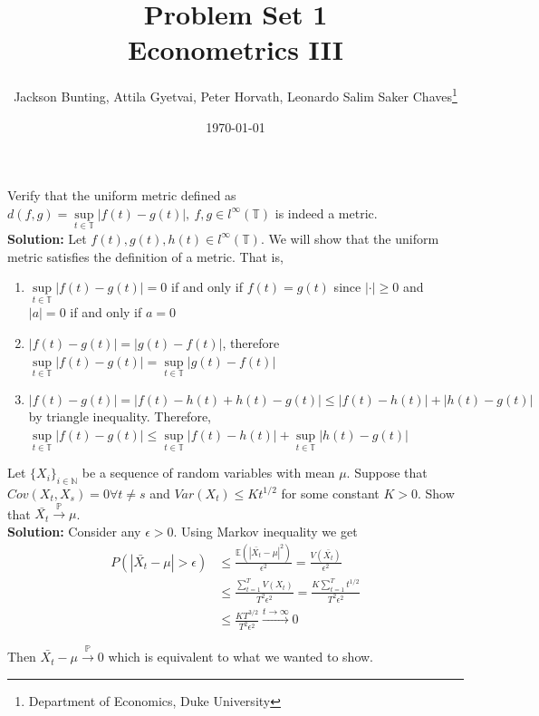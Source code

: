 \documentclass[11pt,letterpaper]{article}                  %
\title{Problem Set 1 \\ \medskip \Large{Econometrics III}}
\author{\Large Jackson Bunting, Attila Gyetvai, Peter Horvath, Leonardo Salim Saker Chaves\footnote{Department of Economics, Duke University}}
\date{\today}
\begin{document}
\maketitle
\begin{problem}
Verify that the uniform metric defined as $d (f, g) = \sup\limits_{t \in \mathbb{T}} |f(t) - g(t)|, \:  f, g \in l^{\infty}(\mathbb{T})$ is indeed a metric. \\

\textbf{Solution:} Let $f(t), g(t), h(t) \in l^{\infty}(\mathbb{T})$. We will show that the uniform metric satisfies the definition of a metric. That is, 
\begin{enumerate}
	\item  $\sup\limits_{t \in \mathbb{T}} |f(t) - g(t)| = 0$ if and only if $f(t) = g(t)$ since $|\cdot| \geq 0$ and $|a| = 0$ if and only if $a = 0$
	\item  $|f(t) - g(t)| = |g(t) - f(t)|$, therefore $\sup\limits_{t \in \mathbb{T}} |f(t) - g(t)| = \sup\limits_{t \in \mathbb{T}} |g(t) - f(t)|$
	\item $|f(t) - g(t)| = |f(t) - h(t) + h(t) - g(t)| \leq |f(t) - h(t)| +  |h(t) - g(t)|$ by triangle inequality. Therefore, $\sup\limits_{t \in \mathbb{T}} |f(t) - g(t)| \leq  \sup\limits_{t \in \mathbb{T}} |f(t) - h(t)| + \sup\limits_{t \in \mathbb{T}} |h(t) - g(t)|$
\end{enumerate}
\end{problem}

\bigskip
\begin{problem}

\end{problem}

\bigskip
\begin{problem}
Let $\{X_i\}_{i \in \mathbb{N}}$ be a sequence of random variables with mean $\mu$. Suppose that $Cov(X_t,X_s)=0 \forall t\neq s$ and $Var(X_t) \leq Kt^{1/2}$ for some constant $K>0$. Show that $\bar{X_t} \overset{\mathbb{P}}{\rightarrow} \mu$.\\

\textbf{Solution:} Consider any $\epsilon>0$. Using Markov inequality we get
\begin{align*}
P(|\bar{X_t} - \mu| > \epsilon) &\leq \frac{\mathbb{E}( |\bar{X_t} - \mu|^2)}{\epsilon^2} = \frac{V(\bar{X_t})}{\epsilon^2} \\
&\leq \frac{\sum_{t=1}^T V(X_t)}{T^2 \epsilon^2} = \frac{K \sum_{t=1}^T t^{1/2}}{T^2 \epsilon^2} \\
&\leq \frac{K T^{3/2}}{T^2 \epsilon^2} \overset{t \to \infty}{\longrightarrow} 0
\end{align*}

Then $\bar{X_t} - \mu \overset{\mathbb{P}}{\rightarrow} 0$ which is equivalent to what we wanted to show.
\end{problem}
\end{document}
